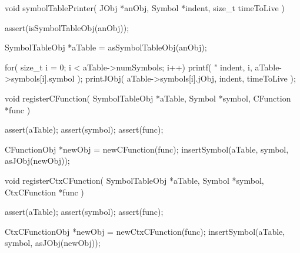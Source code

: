 void symbolTablePrinter(
  JObj   *anObj,
  Symbol *indent,
  size_t  timeToLive
) {
  assert(isSymbolTableObj(anObj));
  
  SymbolTableObj *aTable = asSymbolTableObj(anObj);
  
  for( size_t i = 0; i < aTable->numSymbols; i++) {
    printf(
      "%
      indent,
      i,
      aTable->symbols[i].symbol
    );
    printJObj(
      aTable->symbols[i].jObj,
      indent,
      timeToLive
    );
  }
}

void registerCFunction(
  SymbolTableObj *aTable,
  Symbol         *symbol,
  CFunction      *func
) {
  assert(aTable);
  assert(symbol);
  assert(func);
  
  CFunctionObj *newObj = newCFunction(func);
  insertSymbol(aTable, symbol, asJObj(newObj));
}

void registerCtxCFunction(
  SymbolTableObj *aTable,
  Symbol         *symbol,
  CtxCFunction   *func
) {
  assert(aTable);
  assert(symbol);
  assert(func);
  
  CtxCFunctionObj *newObj = newCtxCFunction(func);
  insertSymbol(aTable, symbol, asJObj(newObj));
}

\stopCCode

